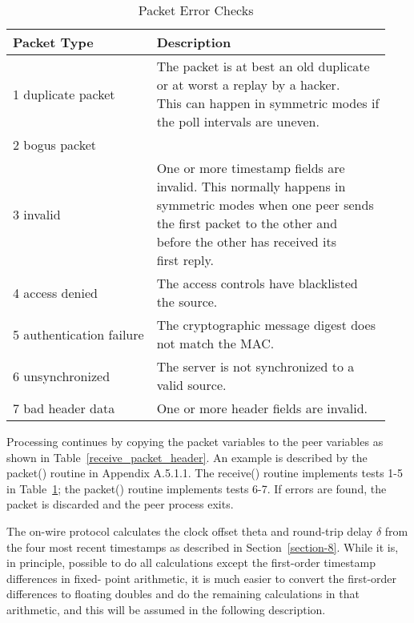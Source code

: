 \begin{description}
    \begin{table}[htb]
    \center
    \begin{tabular}{| l | l |}
    \hline
    Packet Type & Description \\
    \hline
    \hline
    1 duplicate packet & \makecell[l]{The packet is at best an old duplicate \\ or at worst a replay by a hacker. \\ This can happen in symmetric modes if \\ the poll intervals are uneven.} \\
    2 bogus packet & \\
    3 invalid & \makecell[l]{One or more timestamp fields are \\ invalid. This normally happens in \\ symmetric modes when one peer sends \\ the first packet to the other and \\ before the other has received its \\ first reply.} \\
    4 access denied & \makecell[l]{The access controls have blacklisted \\ the source.} \\
    5 authentication failure & \makecell[l]{The cryptographic message digest does \\ not match the MAC.} \\
    6 unsynchronized & \makecell[l]{The server is not synchronized to a \\ valid source.} \\
    7 bad header data & One or more header fields are invalid. \\
    \hline
    \end{tabular}
    \caption{Packet Error Checks}
    \label{packet_error_checks}
    \end{table}

\end{description}

Processing continues by copying the packet variables to the peer
variables as shown in Table~\ref{receive_packet_header}. An example is described by the
packet() routine in Appendix A.5.1.1. The receive() routine
implements tests 1-5 in Table~\ref{packet_error_checks}; the packet() routine implements
tests 6-7. If errors are found, the packet is discarded and the peer
process exits.

The on-wire protocol calculates the clock offset theta and round-trip
delay $ \delta $ from the four most recent timestamps as described in
Section~\ref{section-8}. While it is, in principle, possible to do all
calculations except the first-order timestamp differences in fixed-
point arithmetic, it is much easier to convert the first-order
differences to floating doubles and do the remaining calculations in
that arithmetic, and this will be assumed in the following
description.

